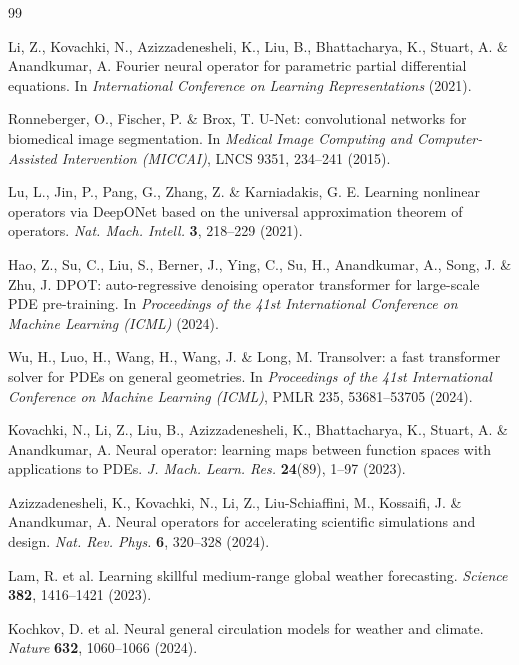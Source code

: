 \documentclass[11pt,a4paper]{article}
\begin{document}
\begin{thebibliography}{99}
\footnotesize

 Li, Z., Kovachki, N., Azizzadenesheli, K., Liu, B., Bhattacharya, K., Stuart, A. \& Anandkumar, A. Fourier neural operator for parametric partial differential equations. In \emph{International Conference on Learning Representations} (2021).

 Ronneberger, O., Fischer, P. \& Brox, T. U-Net: convolutional networks for biomedical image segmentation. In \emph{Medical Image Computing and Computer-Assisted Intervention (MICCAI)}, LNCS 9351, 234--241 (2015).

 Lu, L., Jin, P., Pang, G., Zhang, Z. \& Karniadakis, G. E. Learning nonlinear operators via DeepONet based on the universal approximation theorem of operators. \emph{Nat. Mach. Intell.} \textbf{3}, 218--229 (2021).

 Hao, Z., Su, C., Liu, S., Berner, J., Ying, C., Su, H., Anandkumar, A., Song, J. \& Zhu, J. DPOT: auto-regressive denoising operator transformer for large-scale PDE pre-training. In \emph{Proceedings of the 41st International Conference on Machine Learning (ICML)} (2024).

 Wu, H., Luo, H., Wang, H., Wang, J. \& Long, M. Transolver: a fast transformer solver for PDEs on general geometries. In \emph{Proceedings of the 41st International Conference on Machine Learning (ICML)}, PMLR 235, 53681--53705 (2024).

 Kovachki, N., Li, Z., Liu, B., Azizzadenesheli, K., Bhattacharya, K., Stuart, A. \& Anandkumar, A. Neural operator: learning maps between function spaces with applications to PDEs. \emph{J. Mach. Learn. Res.} \textbf{24}(89), 1--97 (2023).

 Azizzadenesheli, K., Kovachki, N., Li, Z., Liu-Schiaffini, M., Kossaifi, J. \& Anandkumar, A. Neural operators for accelerating scientific simulations and design. \emph{Nat. Rev. Phys.} \textbf{6}, 320--328 (2024).

 Lam, R. et al. Learning skillful medium-range global weather forecasting. \emph{Science} \textbf{382}, 1416--1421 (2023).

 Kochkov, D. et al. Neural general circulation models for weather and climate. \emph{Nature} \textbf{632}, 1060--1066 (2024).


\end{thebibliography}
\end{document}
